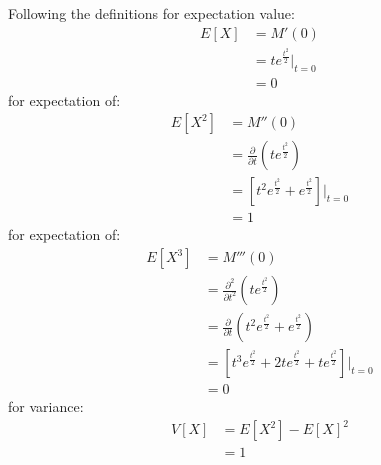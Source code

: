 \documentclass{article}
\newcommand{\1}{\mathbf{1}}
\begin{document}
\begin{enumerate}
    Following the definitions for expectation value:
    \begin{align*}
        E[X] &=  M'(0) \\
        &=  te^{\frac{t^2}{2}}\bigg|_{t=0} \\
        &= 0
    \end{align*}
    for expectation of:
    \begin{align*}
        E[X^2] &=  M''(0) \\
        &= \frac{\partial}{\partial t} \left( te^{\frac{t^2}{2}} \right) \\
        &= \left[ t^2e^{\frac{t^2}{2}} +  e^{\frac{t^2}{2}} \right] \bigg|_{t=0} \\
        &= 1
    \end{align*}
    for expectation of: 
    \begin{align*}
        E[X^3] &=  M'''(0) \\
        &= \frac{\partial^2}{\partial t^2} \left( te^{\frac{t^2}{2}} \right) \\
        &= \frac{\partial}{\partial t} \left( t^2e^{\frac{t^2}{2}} +  e^{\frac{t^2}{2}} \right)\\
        &= \left[ t^3e^{\frac{t^2}{2}} + 2te^{\frac{t^2}{2}} +  te^{\frac{t^2}{2}} \right] \bigg|_{t=0} \\
        &= 0
    \end{align*}
    for variance:
    \begin{align*}
        V[X] &= E[X^2] - E[X]^2 \\
        &= 1
    \end{align*}
    
\end{enumerate}
\end{document}
